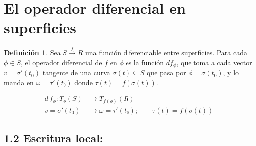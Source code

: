 \documentclass{article}
\theoremstyle{definition}
\newtheorem{definicion}{Definición}[section]
\begin{document}
    \section{El operador diferencial en superficies}

    \begin{definicion}
      Sea $S \xrightarrow{f} R$ una función diferenciable entre superficies. 
      Para cada $\phi \in S$, el operador diferencial de $f$ en $\phi$ es la función $d f_\phi$, 
      que toma a cada vector $v = \sigma'(t_0)$ tangente de una curva $\sigma(t) \subseteq S$ que 
      pasa por $\phi = \sigma(t_0)$, y lo manda en $\omega = \tau'(t_0)$ donde 
      $\tau(t) = f(\sigma(t))$.
 
      \begin{center}
        \begin{equation*}
          \begin{aligned}
            d\, f_\phi: T_\phi(S) &\to T_{f(\phi)}(R) \\
              v = \sigma'(t_0) &\to \omega = \tau'(t_0);\quad\quad \tau(t) = f(\sigma(t))
          \end{aligned}
        \end{equation*}
      \end{center}
    \end{definicion}

  \vspace{1em}
    \subsection*{1.2 Escritura local:}
    \vspace{0.5em}
\end{document}
